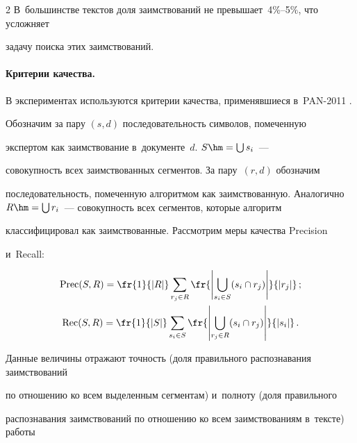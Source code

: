 \begin{multicols}{2}
В~большинстве текстов доля заимствований не превышает~4\%--5$\%$, что усложняет 

задачу поиска этих заимствований.



\vspace*{-6pt}



\paragraph*{Критерии качества.}

В экспериментах используют\-ся критерии качества, применявшиеся в~PAN-2011 \cite{PAN}. 

Обозначим за пару $(s, d)$ последовательность символов, помеченную 

экспертом как заимствование в~документе~$d$. $S \hm= \bigcup s_{i}$~--- 

совокупность всех заимствованных сегментов. За пару~$(r, d)$ обозначим 

последовательность, помеченную алгоритмом как заимствованную. Аналогично $R \hm= 

\bigcup r_{i}$~--- совокупность всех сегментов, которые алгоритм 

классифицировал как заимствованные. Рас\-смот\-рим меры качества {Precision} 

и~{Recall}:



\noindent

\begin{gather*}

\text{Prec}(S,R)=\fr{1}{|R|}\sum\limits_{r_j\in 

R}\fr{\left\vert \bigcup\limits_{s_i\in S}(s_i\cap r_j)\right\vert}{|r_j|}\,;\\ 

\text{Rec}(S,R)=\fr{1}{|S|}\sum\limits_{s_i\in S}\fr{\left\vert

\bigcup\limits_{r_j\in 

R}(s_i\cap r_j)\right\vert}{|s_i|}\,.

\end{gather*}



\noindent

Данные величины отражают точность (доля правильного распознавания заимствований 

по отношению ко всем выделенным сегментам) и~полноту (доля правильного 

распознавания заимствований по отношению ко всем заимствованиям в~тексте) работы 


\end{multicols}
